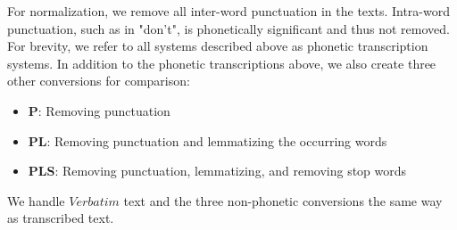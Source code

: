 For normalization, we remove all inter-word punctuation in the texts.
Intra-word punctuation, such as in "don't", is phonetically significant and thus not removed.
For brevity, we refer to all systems described above as phonetic transcription systems.
In addition to the phonetic transcriptions above, we also create three other conversions for comparison:
\begin{itemize}
  \item \textbf{P}: Removing punctuation
  \item \textbf{PL}: Removing punctuation and lemmatizing the occurring words
  \item \textbf{PLS}: Removing punctuation, lemmatizing, and removing stop words
\end{itemize}
We handle $Verbatim$ text and the three non-phonetic conversions the same way as transcribed text.








